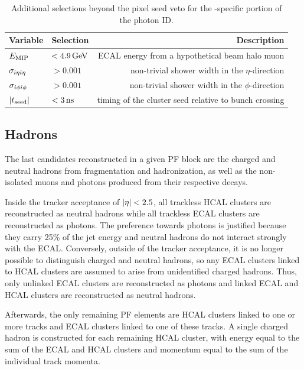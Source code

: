 \begin{table}[htbp]
  \begin{center}
    \begin{tabular}{l | l | r}
      Variable & Selection & Description \\
      \hline
      $\emip\ $ & $< 4.9\,\text{Ge\hspace{-.08em}V}$ & ECAL energy from a hypothetical beam halo muon \\
      $\sieie\ $ & $> 0.001$ & non-trivial shower width in the $\eta$-direction \\
      $\sipip\ $ & $> 0.001$ & non-trivial shower width in the $\phi$-direction \\
      $\lvert t_{\text{seed}} \rvert $ & $< 3\, \text{ns}$ & timing of the cluster seed relative to bunch crossing
    \end{tabular}
    \caption{Additional selections beyond the pixel seed veto for the \Pgg-specific portion of the photon ID.}
    \label{tab:gsid}
  \end{center}
\end{table}

\subsection{Hadrons} 
\label{sec:pf_hadrons}

The last candidates reconstructed in a given PF block are the charged and neutral hadrons from fragmentation and hadronization, as well as the non-isolated muons and photons produced from their respective decays.

Inside the tracker acceptance of $\lvert \eta \rvert < 2.5$, all trackless HCAL clusters are reconstructed as neutral hadrons while all trackless ECAL clusters are reconstructed as photons.
The preference towards photons is justified because they carry 25\% of the jet energy and neutral hadrons do not interact strongly with the ECAL.
Conversely, outside of the tracker acceptance, it is no longer possible to distinguish charged and neutral hadrons, so any ECAL clusters linked to HCAL clusters are assumed to arise from unidentified charged hadrons.
Thus, only unlinked ECAL clusters are reconstructed as photons and linked ECAL and HCAL clusters are reconstructed as neutral hadrons.

Afterwards, the only remaining PF elements are HCAL clusters linked to one or more tracks and ECAL clusters linked to one of these tracks.
A single charged hadron is constructed for each remaining HCAL cluster, with energy equal to the sum of the ECAL and HCAL clusters and momentum equal to the sum of the individual track momenta.

